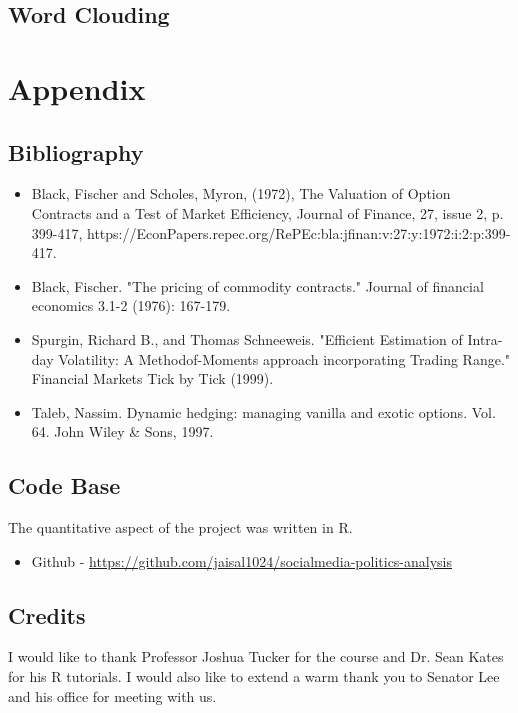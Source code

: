\documentclass{article}
\begin{document}
\subsection{Word Clouding}
\begin{flushleft}

\end{flushleft}

\section{Appendix}
\subsection{Bibliography}
\begin{itemize}
\item Black, Fischer and Scholes, Myron, (1972), The Valuation of Option Contracts and a Test of Market Efficiency, Journal of Finance, 27, issue 2, p. 399-417, https://EconPapers.repec.org/RePEc:bla:jfinan:v:27:y:1972:i:2:p:399-417.
\item Black, Fischer. "The pricing of commodity contracts." Journal of financial economics 3.1-2 (1976): 167-179.
\item Spurgin, Richard B., and Thomas Schneeweis. "Efficient Estimation of Intra-day Volatility: A Methodof-Moments approach incorporating Trading Range." Financial Markets Tick by Tick (1999).
\item Taleb, Nassim. Dynamic hedging: managing vanilla and exotic options. Vol. 64. John Wiley \& Sons, 1997.
\end{itemize}

\subsection{Code Base}
\begin{flushleft}
 The quantitative aspect of the project was written in R. 
\begin{itemize}
\item Github -  \url{https://github.com/jaisal1024/socialmedia-politics-analysis}
\end{itemize}
\end{flushleft}

\subsection{Credits}
\begin{flushleft}
I would like to thank Professor Joshua Tucker for the course and Dr. Sean Kates for his R tutorials. I would also like to extend a warm thank you to Senator Lee and his office for meeting with us. 
\end{flushleft}
\end{document}
